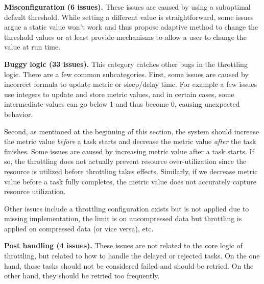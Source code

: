 \vspace{.05in}
\noindent
\textbf{Misconfiguration (6 issues).} These issues are caused by using a suboptimal default
threshold. While setting a different value is straightforward, some issues argue a static value
won't work and thus propose adaptive method to change the threshold values or at least
provide mechanisms to allow a user to change the value at run time.

\vspace{.05in}
\noindent
\textbf{Buggy logic (33 issues).} This category catches other bugs in the throttling logic.
There are a few common subcategories. First, some issues are caused by incorrect formula
to update metric or sleep/delay time. For example a few issues use integers to update and
store metric values, and in certain cases, some intermediate values can go below 1 and thus
become 0, causing unexpected behavior. 

Second, as mentioned at the beginning of this section,
the system should increase the metric value \emph{before} a task starts and decrease the metric 
value \emph{after} the task finishes. Some issues are caused by increasing metric value after
a task starts. If so, the throttling does not actually prevent resource over-utilization since the
resource is utilized before throttling takes effects. Similarly, if we decrease metric value before
a task fully completes, the metric value does not accurately capture resource utilization.

Other issues include a throttling configuration exists but is not applied due to missing implementation,
the limit is on uncompressed data but throttling is applied on compressed data (or vice versa), etc.

\vspace{.05in}
\noindent
\textbf{Post handling (4 issues).} These issues are not related to the core logic of throttling, but related
to how to handle the delayed or rejected tasks. On the one hand, those tasks should not be considered
failed and should be retried. On the other hand, they should be retried too frequently.

